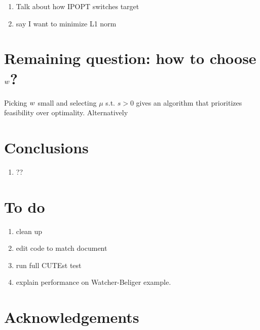 \documentclass{article}
\begin{document}
\begin{enumerate}
\item Talk about how IPOPT switches target
\item say I want to minimize L1 norm
\end{enumerate}

\if{}
\section{Remaining question: how to choose $w$?}

Picking $w$ small and selecting $\mu$ s.t. $s > 0$ gives an algorithm that prioritizes feasibility over optimality. Alternatively 

\fi


\if{}


\section{Conclusions}
\begin{enumerate}
\item ??
\end{enumerate}


\section{To do}

\begin{enumerate}
\item clean up 
\item edit code to match document
\item run full CUTEst test
\item explain performance on Watcher-Beliger example.
\end{enumerate}

\fi




\section*{Acknowledgements}
\end{document}
